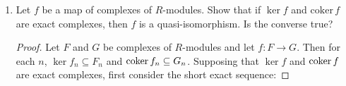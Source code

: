 \documentclass[11pt,oneside,english]{amsart}
\theoremstyle{definition}
\newcommand{\lspace}{\vspace{5mm}}
\newcommand{\coker}{\text{coker\,}}
\begin{document}
\rightline{\today}

\lspace




\begin{enumerate}[leftmargin=*]
\itemsep5mm

\item Let $f$ be a map of complexes of $R$-modules. Show that if $\ker f$ and $\text{coker}\,f$ are exact complexes, then $f$ is a quasi-isomorphism. Is the converse true?

\begin{proof}
Let $F$ and $G$ be complexes of $R$-modules and let $f:F\to G$. Then for each $n$, $\ker f_n\subseteq F_n$ and $\coker f_n\subseteq G_n$. Supposing that $\ker f$ and $\coker f$ are exact complexes, first consider the short exact sequence:


\end{proof}
\end{enumerate}
\end{document}
